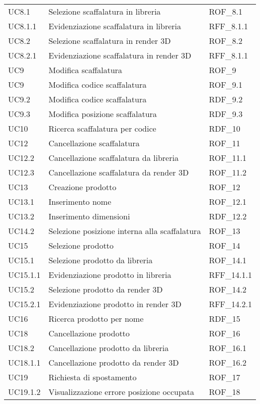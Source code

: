 \begin{xltabular}{\textwidth}{ p{0.3\textwidth} | X | p{0.2\textwidth} }
    UC8.1 & Selezione scaffalatura in libreria & ROF\_8.1\\
    UC8.1.1 & Evidenziazione scaffalatura in libreria & RFF\_8.1.1\\
    UC8.2 & Selezione scaffalatura in render 3D & ROF\_8.2\\
    UC8.2.1 & Evidenziazione scaffalatura in render 3D & RFF\_8.1.1\\
    UC9 & Modifica scaffalatura & ROF\_9\\
    UC9 & Modifica codice scaffalatura & ROF\_9.1\\
    UC9.2 &  Modifica codice scaffalatura & RDF\_9.2\\
    UC9.3 & Modifica posizione scaffalatura & RDF\_9.3\\
    UC10 & Ricerca scaffalatura per codice & RDF\_10\\
    UC12 & Cancellazione scaffalatura & ROF\_11\\
    UC12.2 &  Cancellazione scaffalatura da libreria & ROF\_11.1\\
    UC12.3 & Cancellazione scaffalatura da render 3D & ROF\_11.2\\
    UC13 & Creazione prodotto & ROF\_12\\
    UC13.1 & Inserimento nome & ROF\_12.1\\
    UC13.2 &  Inserimento dimensioni & RDF\_12.2\\    
    UC14.2 & Selezione posizione interna alla scaffalatura & ROF\_13\\
    UC15 & Selezione prodotto & ROF\_14\\
    UC15.1 &  Selezione prodotto da libreria & ROF\_14.1\\
    UC15.1.1 & Evidenziazione prodotto in libreria & RFF\_14.1.1\\
    UC15.2 & Selezione prodotto da render 3D & ROF\_14.2\\
    UC15.2.1 & Evidenziazione prodotto in render 3D & RFF\_14.2.1\\
    UC16 & Ricerca prodotto per nome & RDF\_15\\
    UC18 & Cancellazione prodotto & ROF\_16\\
    UC18.2 & Cancellazione prodotto da libreria & ROF\_16.1\\
    UC18.1.1 & Cancellazione prodotto da render 3D & ROF\_16.2\\
    UC19 & Richiesta di spostamento & ROF\_17\\
    UC19.1.2 & Visualizzazione errore posizione occupata & ROF\_18\\

    \hline
\end{xltabular}



